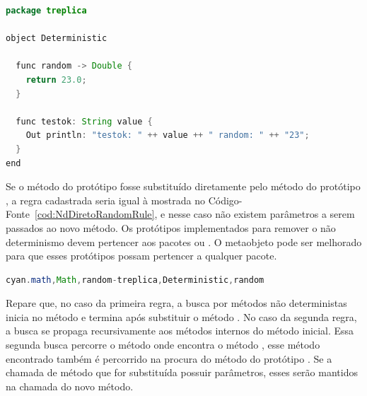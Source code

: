 \begin{lstlisting}[language=Java, caption={Protótipo com método determinista}, label={cod:NdDeterministMethodExample}]
package treplica

object Deterministic

  func random -> Double {
    return 23.0;
  }

  func testok: String value {
    Out println: "testok: " ++ value ++ " random: " ++ "23";
  }
end
\end{lstlisting}

Se o método  do protótipo  fosse substituído diretamente pelo método  do protótipo , a regra cadastrada seria igual à mostrada no Código-Fonte~\ref{cod:NdDiretoRandomRule}, e nesse caso não existem parâmetros a serem passados ao novo método. Os protótipos implementados para remover o não determinismo devem pertencer aos pacotes  ou . O metaobjeto  pode ser melhorado para que esses protótipos possam pertencer a qualquer pacote.

\begin{lstlisting}[language=Java, caption={Regra de substituição cadastrada}, label={cod:NdDiretoRandomRule}]
cyan.math,Math,random-treplica,Deterministic,random
\end{lstlisting}

Repare que, no caso da primeira regra, a busca por métodos não deterministas inicia no método  e termina após substituir o método . No caso da segunda regra, a busca se propaga recursivamente aos métodos internos do método inicial. Essa segunda busca percorre o método  onde encontra o método , esse método encontrado também é percorrido na procura do método  do protótipo . Se a chamada de método que for substituída possuir parâmetros, esses serão mantidos na chamada do novo método.